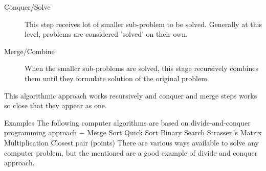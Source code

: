 \documentclass[algocomplexity.tex]{subfiles}
\begin{document}
\begin{frame}
	\begin{description}
		\item[Conquer/Solve]
		This step receives lot of smaller sub-problem to be solved. Generally at this level, problems are considered 'solved' on their own.
		
		\item[Merge/Combine]
		When the smaller sub-problems are solved, this stage recursively combines them until they formulate solution of the original problem.
	\end{description}
\end{frame}
\begin{frame}
	This algorithmic approach works recursively and conquer and merge steps works so close that they appear as one.
	
	
\end{frame}
\begin{frame}
	Examples
	The following computer algorithms are based on divide-and-conquer programming approach −
	Merge Sort
	Quick Sort
	Binary Search
	Strassen's Matrix Multiplication
	Closest pair (points)
	There are various ways available to solve any computer problem, but the mentioned are a good example of divide and conquer approach.
	
\end{frame}
\end{document}
